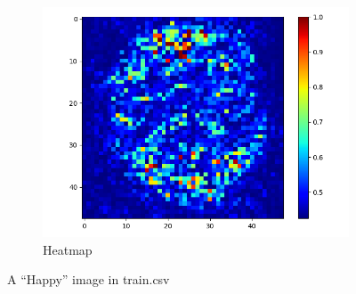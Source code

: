 \documentclass[12pt,a4paper]{extarticle}
\begin{document}
\begin{enumerate}
\begin{figure}[ht]
\begin{subfigure}[t]{0.32\textwidth}
      \includegraphics[width=\linewidth]{images/heatmap-14.png}
      \caption{Heatmap}
      \label{fig:heatmap-14}
    \end{subfigure}
    \caption{A ``Happy'' image in train.csv}
    \label{fig:image-14-comparison}
  \end{figure}


\end{enumerate}
\end{document}

